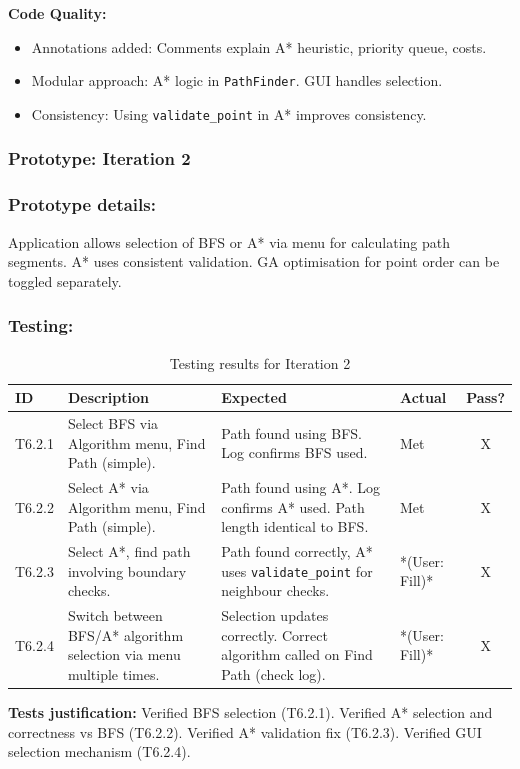 \textbf{Code Quality:}
\begin{itemize}
	\item Annotations added: Comments explain A* heuristic, priority queue, costs.
	\item Modular approach: A* logic in \verb|PathFinder|. GUI handles selection.
	\item Consistency: Using \verb|validate_point| in A* improves consistency.
\end{itemize}

\subsubsection*{Prototype: Iteration 2}


\subsubsection{Prototype details:}
Application allows selection of BFS or A* via menu for calculating path segments. A* uses consistent validation. GA optimisation for point order can be toggled separately.

\subsubsection{Testing:} %
\begin{table}[htbp]
	\centering
	\begin{tabularx}{\textwidth}{|l|X|p{4.5cm}|p{1.5cm}|c|}
		\hline
		\textbf{ID} & \textbf{Description} & \textbf{Expected} & \textbf{Actual} & \textbf{Pass?} \\
		\hline
		T6.2.1 & Select BFS via Algorithm menu, Find Path (simple). & Path found using BFS. Log confirms BFS used. & Met & X \\
		\hline
		T6.2.2 & Select A* via Algorithm menu, Find Path (simple). & Path found using A*. Log confirms A* used. Path length identical to BFS. & Met & X \\
		\hline
		T6.2.3 & Select A*, find path involving boundary checks. & Path found correctly, A* uses \verb|validate_point| for neighbour checks. & *(User: Fill)* & X \\
		\hline
		T6.2.4 & Switch between BFS/A* algorithm selection via menu multiple times. & Selection updates correctly. Correct algorithm called on Find Path (check log). & *(User: Fill)* & X \\
		\hline
	\end{tabularx}
	\caption{Testing results for Iteration 2}
\end{table}
\textbf{Tests justification:} Verified BFS selection (T6.2.1). Verified A* selection and correctness vs BFS (T6.2.2). Verified A* validation fix (T6.2.3). Verified GUI selection mechanism (T6.2.4).

